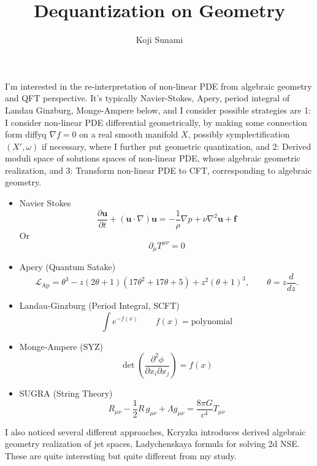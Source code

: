 \documentclass{article}
\title{Dequantization on Geometry}
\author{Koji Sunami}
\begin{document}
\maketitle
\vspace{1cm}




\noindent
I'm interested in the re-interpretation of non-linear PDE from algebraic geometry and QFT perspective.
It's typically Navier-Stokes, Apery, period integral of Landau Ginzburg, Monge-Ampere below,
and I consider possible strategies are 1: I consider non-linear PDE differential geometrically, 
by making some connection form diffyq $\nabla f=0$ on a real smooth manifold $X$,
possibly symplectification $(X',\omega)$ if necessary, where I further put geometric quantization,
and 2: Derived moduli space of solutions spaces of non-linear PDE, whose algebraic geometric realization,
and 3: Transform non-linear PDE to CFT, corresponding to algebraic geometry. \\


\vspace{1cm}
\begin{itemize}
\item Navier Stokes \\
\[ \frac{\partial \mathbf{u}}{\partial t} +(\mathbf{u}\cdot\nabla)\mathbf{u} =-\frac{1}{\rho}\nabla p +\nu\nabla^2\mathbf{u} +\mathbf{f} \]
Or
\[ \partial_\mu T^{\mu\nu} = 0 \]
\item Apery (Quantum Satake)
\[ \mathcal L_{\mathrm{Ap}} =\theta^3 -z(2\theta+1)(17\theta^2+17\theta+5) +z^2(\theta+1)^3, \qquad \theta=z\frac{d}{dz}.  \]
\item Landau-Ginzburg (Period Integral, SCFT)
\[ \int e^{-f(x)} \qquad f(x) = \text{polynomial} \]
\item Monge-Ampere (SYZ)
\[ \det\left(\frac{\partial^2\phi} {\partial x_i\partial x_j}\right)=f(x) \]
\item SUGRA (String Theory)
\[ R_{\mu\nu}-\frac{1}{2}R\,g_{\mu\nu}+\Lambda g_{\mu\nu}=\frac{8\pi G}{c^4}T_{\mu\nu} \]
\end{itemize}
\vspace{1cm}



\begin{remark}{}{}
I also noticed several different approaches, Kcryzka introduces derived algebraic geometry realization of jet spaces,
Ladychenskaya formula for solving 2d NSE. These are quite interesting but quite different from my study.
\end{remark}
\end{document}
